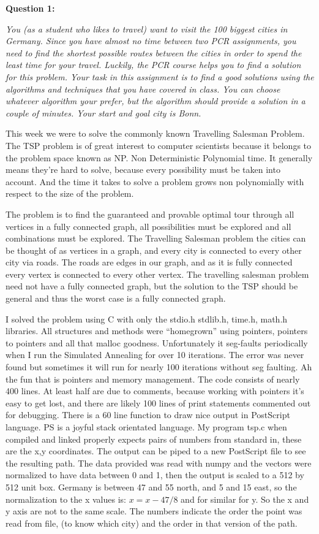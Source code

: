 \noindent\textbf{Question 1:}

\noindent\emph{You (as a student who likes to travel) want to visit the 100 biggest cities in Germany. Since you have almost no time between two PCR assignments, you need to find the shortest possible routes between the cities in order to spend the least time for your travel. Luckily, the PCR course helps you to find a solution for this problem.
Your task in this assignment is to find a good solutions using the algorithms and techniques that you have covered in class. You can choose whatever algorithm your prefer, but the algorithm should provide a solution in a couple of minutes. Your start and goal city is Bonn.}

This week we were to solve the commonly known Travelling Salesman Problem. The TSP problem is of great interest to computer scientists because it belongs to the problem space known as NP. Non Deterministic Polynomial time. It generally means they're hard to solve, because every possibility must be taken into account. And the time it takes to solve a problem grows non polynomially with respect to the size of the problem. 

The problem is to find the guaranteed and provable optimal tour through all vertices in a fully connected graph, all possibilities must be explored and all combinations must be explored. The Travelling Salesman problem the cities can be thought of as vertices in a graph, and every city is connected to every other city via roads. The roads are edges in our graph, and as it is fully connected every vertex is connected to every other vertex. The travelling salesman problem need not have a fully connected graph, but the solution to the TSP should be general and thus the worst case is a fully connected graph.  

I solved the problem using C with only the stdio.h stdlib.h, time.h, math.h libraries. All structures and methods were ``homegrown'' using pointers, pointers to pointers and all that malloc goodness. Unfortunately it seg-faults periodically when I run the Simulated Annealing for over 10 iterations. The error was never found but sometimes it will run for nearly 100 iterations without seg faulting. Ah the fun that is pointers and memory management. The code consists of nearly 400 lines. At least half are due to comments, because working with pointers it's easy to get lost, and there are likely 100 lines of print statements commented out for debugging. There is a 60 line function to draw nice output in PostScript language. PS is a joyful stack orientated language. My program tsp.c when compiled and linked properly expects pairs of numbers from standard in, these are the x,y coordinates. The output can be piped to a new PostScript file to see the resulting path. The data provided was read with numpy and the vectors were normalized  to have data between 0 and 1, then the output is scaled to a 512 by 512 unit box. Germany is between 47 and 55 north, and 5 and 15 east, so the normalization to the x values is: $x = x-47/8  $ and for similar for y. So the x and y axis are not to the same scale. The numbers indicate the order the point was read from file, (to know which city) and the order in that version of the path.



